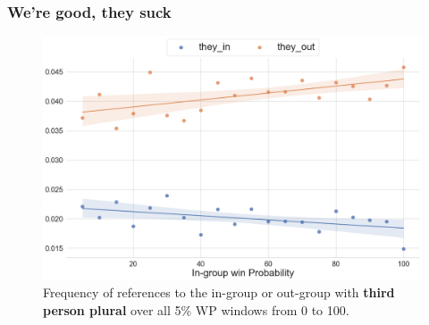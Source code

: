 \begin{frame}[c]\frametitle{We're good, they suck}
    \pause
    \begin{figure}[t]
        \centering
        \includegraphics[width=0.85\linewidth]{figures/trends-4.png}
        \caption{Frequency of references to the in-group or out-group with \textbf{third person plural} over all 5\% WP windows from 0 to 100.}
        \label{fig:trends-4}
    \end{figure}
\end{frame}

